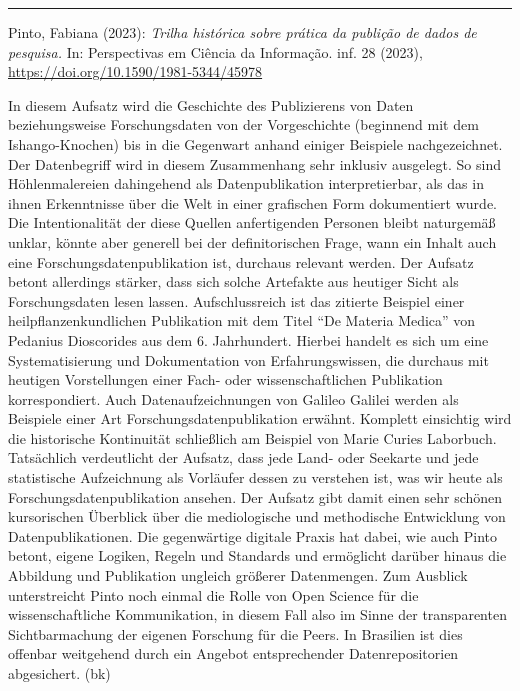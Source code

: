 \documentclass[a4paper,
fontsize=11pt,
oneside,
numbers=noperiodatend,
parskip=half-,
bibliography=totoc,
final
]{scrartcl}
\begin{document}
\begin{center}\rule{0.5\linewidth}{0.5pt}\end{center}

Pinto, Fabiana (2023): \emph{Trilha histórica sobre prática da publição
de dados de pesquisa.} In: Perspectivas em Ciência da Informação. inf.
28 (2023), \url{https://doi.org/10.1590/1981-5344/45978}

In diesem Aufsatz wird die Geschichte des Publizierens von Daten
beziehungsweise Forschungsdaten von der Vorgeschichte (beginnend mit dem
Ishango-Knochen) bis in die Gegenwart anhand einiger Beispiele
nachgezeichnet. Der Datenbegriff wird in diesem Zusammenhang sehr
inklusiv ausgelegt. So sind Höhlenmalereien dahingehend als
Datenpublikation interpretierbar, als das in ihnen Erkenntnisse über die
Welt in einer grafischen Form dokumentiert wurde. Die Intentionalität
der diese Quellen anfertigenden Personen bleibt naturgemäß unklar,
könnte aber generell bei der definitorischen Frage, wann ein Inhalt auch
eine Forschungsdatenpublikation ist, durchaus relevant werden. Der
Aufsatz betont allerdings stärker, dass sich solche Artefakte aus
heutiger Sicht als Forschungsdaten lesen lassen. Aufschlussreich ist das
zitierte Beispiel einer heilpflanzenkundlichen Publikation mit dem Titel
``De Materia Medica'' von Pedanius Dioscorides aus dem 6. Jahrhundert.
Hierbei handelt es sich um eine Systematisierung und Dokumentation von
Erfahrungswissen, die durchaus mit heutigen Vorstellungen einer Fach-
oder wissenschaftlichen Publikation korrespondiert. Auch
Datenaufzeichnungen von Galileo Galilei werden als Beispiele einer Art
Forschungsdatenpublikation erwähnt. Komplett einsichtig wird die
historische Kontinuität schließlich am Beispiel von Marie Curies
Laborbuch. Tatsächlich verdeutlicht der Aufsatz, dass jede Land- oder
Seekarte und jede statistische Aufzeichnung als Vorläufer dessen zu
verstehen ist, was wir heute als Forschungsdatenpublikation ansehen. Der
Aufsatz gibt damit einen sehr schönen kursorischen Überblick über die
mediologische und methodische Entwicklung von Datenpublikationen. Die
gegenwärtige digitale Praxis hat dabei, wie auch Pinto betont, eigene
Logiken, Regeln und Standards und ermöglicht darüber hinaus die
Abbildung und Publikation ungleich größerer Datenmengen. Zum Ausblick
unterstreicht Pinto noch einmal die Rolle von Open Science für die
wissenschaftliche Kommunikation, in diesem Fall also im Sinne der
transparenten Sichtbarmachung der eigenen Forschung für die Peers. In
Brasilien ist dies offenbar weitgehend durch ein Angebot entsprechender
Datenrepositorien abgesichert. (bk)
\end{document}
